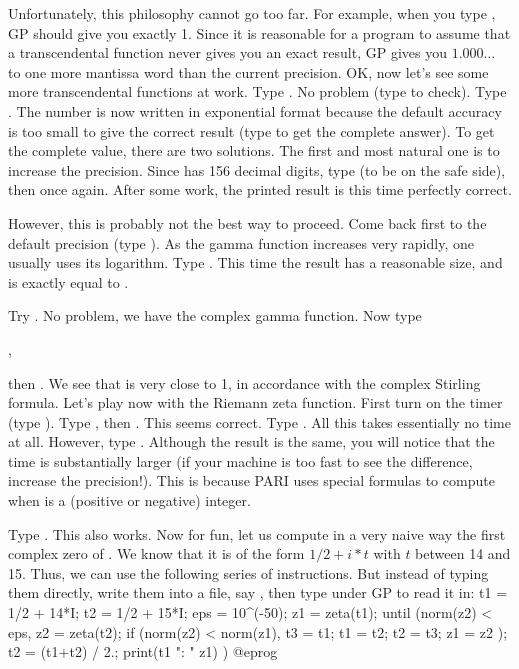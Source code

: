 Unfortunately, this philosophy cannot go too far. For example, when you
type , GP should give you exactly 1. Since it is reasonable for
a program to assume that a transcendental function never gives you an exact
result, GP gives you $1.000\dots$ to one more mantissa word than the current
precision.
\medskip
OK, now let's see some more transcendental functions at work. Type
. No problem (type  to check). Type .
The number is now written in exponential format because the default
accuracy is too small to give the correct result (type  to get the
complete answer).
To get the complete value, there are two solutions. The first and most natural
one is to increase the precision. Since  has 156 decimal
digits, type  (to be on the safe side), then 
once again. After some work, the printed result is this time perfectly
correct.

However, this is probably not the best way to proceed. Come back first to the
default precision (type ). As the gamma function increases
very rapidly, one usually uses its logarithm. Type . This
time the result has a reasonable size, and is exactly equal to .

Try . No problem, we have the complex gamma function.
Now type

,

\noindent then . We see that  is very close to 1,
in accordance with the complex Stirling formula. \smallskip
%
Let's play now with the Riemann zeta function. First turn on the timer (type
\kbd{\#}). Type , then . This seems correct. Type
. All this takes essentially no time at all. However, type
. Although the result is the same, you will notice that the
time is substantially larger (if your machine is too fast to see the
difference, increase the precision!). This is because PARI uses special
formulas to compute  when  is a (positive or negative)
integer.

Type . This also works. Now for fun, let us compute in a
very naive way the first complex zero of . We know that it is
of the form $1/2 + i*t$ with $t$ between 14 and 15. Thus, we can use the
following series of instructions. But instead of typing them directly, write
them into a file, say , then type  under GP to
read it in:
\bprog
{
  t1 = 1/2 + 14*I;
  t2 = 1/2 + 15*I; eps = 10^(-50);
  z1 = zeta(t1);
  until (norm(z2) < eps,
    z2 = zeta(t2);
    if (norm(z2) < norm(z1),
      t3 = t1; t1 = t2; t2 = t3; z1 = z2
    );
    t2 = (t1+t2) / 2.;
    print(t1 ": " z1)
  )
}
@eprog

